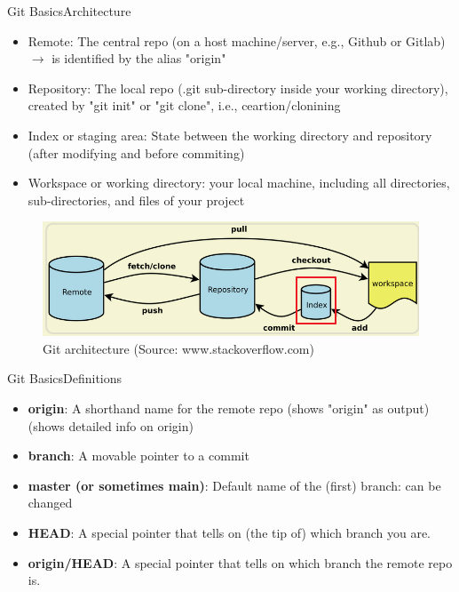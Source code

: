 \documentclass{beamer}
\begin{document}
\begin{frame}{Git Basics}{Architecture}
  \begin{itemize}
    \item Remote: The central repo (on a host machine/server, e.g., Github or Gitlab)
      {\color{red}$\rightarrow$ is identified by the alias "origin"}
    \item Repository: The local repo (.git sub-directory inside your working directory), created by "git init" or "git clone", i.e., ceartion/clonining
    \item Index or staging area: State between the working directory and repository (after modifying and before commiting)
    \item Workspace or working directory: your local machine, including all directories, sub-directories, and files of your project
  \end{itemize}
  \begin{figure}
    \begin{center}
    \includegraphics[width=0.8\linewidth]{pics/architecture.png}
    \vspace{-0.3cm}
    \caption{\small Git architecture (Source: www.stackoverflow.com)}
  \end{center}
\end{figure}

\end{frame}

\begin{frame}{Git Basics}{Definitions}
  \begin{itemize}
    \item \textbf{origin}: A shorthand name for the remote repo
       (shows "origin" as output)
       (shows detailed info on origin)
\item \textbf{branch}: A movable pointer to a commit
\item \textbf{master (or sometimes main)}: Default name of the (first) branch: can be changed
\item \textbf{HEAD}: A special pointer that tells on (the tip of) which branch you are.
\item \textbf{origin/HEAD}: A special pointer that tells on which branch the remote repo is.
\end{itemize}
\end{frame}
\end{document}
